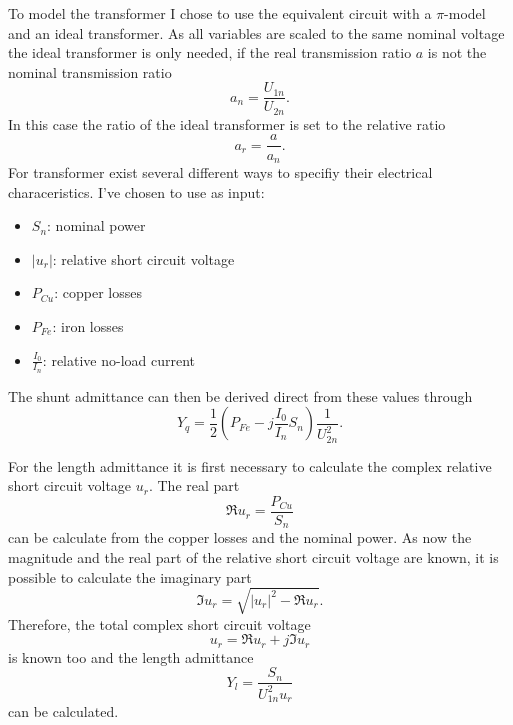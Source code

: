 To model the transformer I chose to use the equivalent circuit  with a $\pi$-model and an ideal transformer. As all variables are scaled to the same nominal voltage the ideal transformer is only needed, if the real transmission ratio $a$ is not the nominal transmission ratio
\begin{equation}
	a_n = \frac{U_{1n}}{U_{2n}}.
\end{equation}
In this case the ratio of the ideal transformer is set to the relative ratio
\begin{equation}
	a_r = \frac{a}{a_n}.
\end{equation}
For transformer exist several different ways to specifiy their electrical characeristics. I've chosen to use as input:
\begin{itemize}
	\item $S_n$: nominal power
	\item $|u_r|$: relative short circuit voltage
	\item $P_{Cu}$: copper losses
	\item $P_{Fe}$: iron losses
	\item $\frac{I_0}{I_n}$: relative no-load current
\end{itemize}

The shunt admittance can then be derived direct from these values through
\begin{equation}
	Y_q = \frac{1}{2} \left( P_{Fe} - j \frac{I_0}{I_n} S_n \right) \frac{1}{U_{2n}^2}.
\end{equation}

For the length admittance it is first necessary to calculate the complex relative short circuit voltage $u_r$. The real part
\begin{equation}
	\Re{u_r} = \frac{P_{Cu}}{S_n}
\end{equation}
can be calculate from the copper losses and the nominal power. As now the magnitude and the real part of the relative short circuit voltage are known, it is possible to calculate the imaginary part
\begin{equation}
	\Im{u_r} = \sqrt{|u_r|^2 - \Re{u_r}}.
\end{equation}
Therefore, the total complex short circuit voltage
\begin{equation}
	u_r = \Re{u_r} + j \Im{u_r}
\end{equation}
is known too and the length admittance
\begin{equation}
	Y_l = \frac{S_n}{U_{1n}^2 u_r}
\end{equation}
can be calculated.

